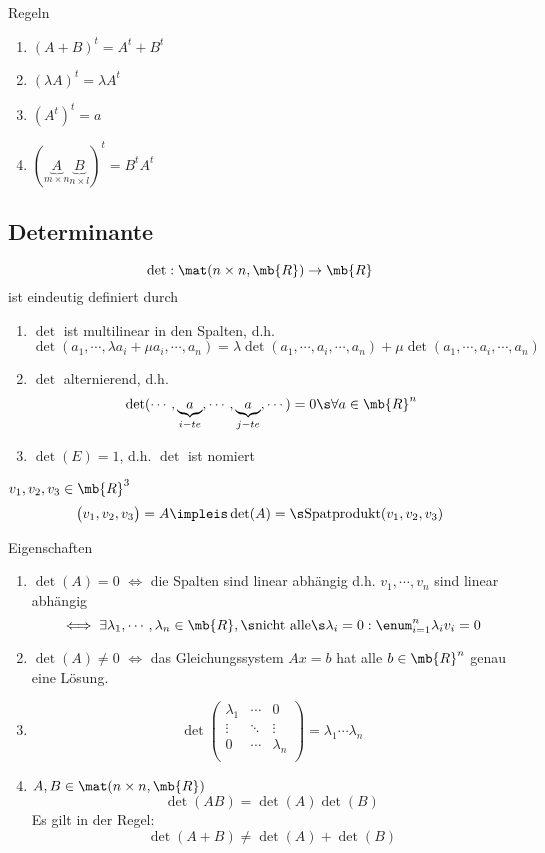 \begin{Bem}
  Regeln
  \begin{enumerate}
    \item $(A+B)^t=A^t+B^t$
    \item $(\lambda A)^t=\lambda A^t$
    \item $(A^t)^t=a$
    \item $(\underbrace{A}_{m\times n}\underbrace{B}_{n\times l})^t=B^tA^t$
  \end{enumerate}
\end{Bem}
\subsection{Determinante}
\begin{Def}
  \[\det:\mat(n\times n,\mb{R})\to\mb{R}\]
  ist eindeutig definiert durch
  \begin{enumerate}
    \item $\det$ ist multilinear in den Spalten, d.h.
      \[\det(a_1,\cdots,\lambda a_i+\mu a_i,\cdots,a_n)=\lambda\det(a_1,\cdots,a_i,\cdots,a_n)+\mu\det(a_1,\cdots,a_i,\cdots,a_n)\]
    \item $\det$ alternierend, d.h.
      \[\det(\cdots,\underbrace{a}_{\text{$i$}-te},\cdots,\underbrace{a}_{\text{$j$}-te},\cdots)=0\s\forall a\in\mb{R}^n\]
    \item $\det(E)=1$, d.h. $\det$ ist nomiert
  \end{enumerate}
\end{Def}
\begin{Bem}
  $v_1,v_2,v_3\in\mb{R}^3$
  \[ \begin{pmatrix}
    v_1,v_2,v_3
  \end{pmatrix}=A \impleis \det(A)=\s\text{Spatprodukt}(v_1,v_2,v_3)\]
\end{Bem}
\begin{Bem}
  Eigenschaften
  \begin{enumerate}
    \item $\det(A)=0$ $\iff$ die Spalten sind linear abhängig d.h. $v_1,\cdots,v_n$ sind linear abhängig 
      \[\iff\exists \lambda_1,\cdots,\lambda_n\in\mb{R},\s\text{nicht alle}\s \lambda_i=0:\enum_{i=1}^n\lambda_i v_i=0\]
    \item $\det(A)\neq 0$ $\iff$ das Gleichungssystem $Ax=b$ hat alle $b\in\mb{R}^n$ genau eine Lösung.
    \item 
      \[\det \begin{pmatrix}
      \lambda_1&\cdots&0\\
      \vdots&\ddots&\vdots\\
      0&\cdots&\lambda_n\\
    \end{pmatrix}=\lambda_1\cdots\lambda_n\]
  \item $A,B\in\mat(n\times n,\mb{R})$
    \[\det(AB)=\det(A)\det(B)\]
    Es gilt in der Regel:
    \[\det(A+B)\neq\det(A)+\det(B)\]
  \end{enumerate}
\end{Bem}
